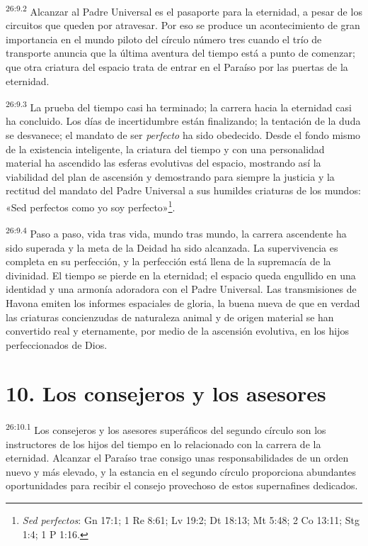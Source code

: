 \par
\textsuperscript{26:9.2} Alcanzar al Padre Universal es el pasaporte para la eternidad, a pesar de los circuitos que queden por atravesar. Por eso se produce un acontecimiento de gran importancia en el mundo piloto del círculo número tres cuando el trío de transporte anuncia que la última aventura del tiempo está a punto de comenzar; que otra criatura del espacio trata de entrar en el Paraíso por las puertas de la eternidad.

\par
\textsuperscript{26:9.3} La prueba del tiempo casi ha terminado; la carrera hacia la eternidad casi ha concluido. Los días de incertidumbre están finalizando; la tentación de la duda se desvanece; el mandato de ser \textit{perfecto} ha sido obedecido. Desde el fondo mismo de la existencia inteligente, la criatura del tiempo y con una personalidad material ha ascendido las esferas evolutivas del espacio, mostrando así la viabilidad del plan de ascensión y demostrando para siempre la justicia y la rectitud del mandato del Padre Universal a sus humildes criaturas de los mundos: «Sed perfectos como yo soy perfecto»\footnote{\textit{Sed perfectos}: Gn 17:1; 1 Re 8:61; Lv 19:2; Dt 18:13; Mt 5:48; 2 Co 13:11; Stg 1:4; 1 P 1:16.}.

\par
\textsuperscript{26:9.4} Paso a paso, vida tras vida, mundo tras mundo, la carrera ascendente ha sido superada y la meta de la Deidad ha sido alcanzada. La supervivencia es completa en su perfección, y la perfección está llena de la supremacía de la divinidad. El tiempo se pierde en la eternidad; el espacio queda engullido en una identidad y una armonía adoradora con el Padre Universal. Las transmisiones de Havona emiten los informes espaciales de gloria, la buena nueva de que en verdad las criaturas concienzudas de naturaleza animal y de origen material se han convertido real y eternamente, por medio de la ascensión evolutiva, en los hijos perfeccionados de Dios.

\section*{10. Los consejeros y los asesores}
\par
\textsuperscript{26:10.1} Los consejeros y los asesores superáficos del segundo círculo son los instructores de los hijos del tiempo en lo relacionado con la carrera de la eternidad. Alcanzar el Paraíso trae consigo unas responsabilidades de un orden nuevo y más elevado, y la estancia en el segundo círculo proporciona abundantes oportunidades para recibir el consejo provechoso de estos supernafines dedicados.

